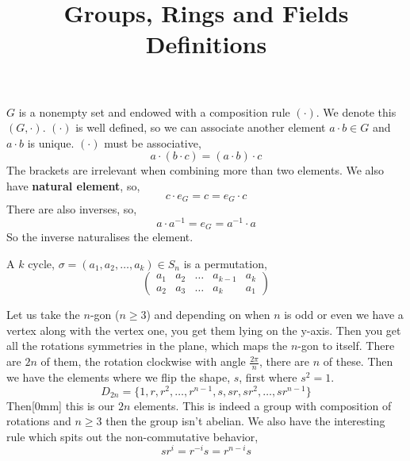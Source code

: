 \documentclass{article}
\title{Groups, Rings and Fields Definitions}
\begin{document}
\maketitle


\section[Basics of Groups]{}

\begin{ndefi}[Group]
  $G$ is a nonempty set and endowed with a composition rule $(\cdot)$. We denote this $(G, \cdot)$. $(\cdot)$ is well defined, so we can associate another element $a \cdot b \in G$ and $a \cdot b$ is unique. $(\cdot)$ must be associative,
  $$ a \cdot (b \cdot c) = (a \cdot b) \cdot c $$
  The brackets are irrelevant when combining more than two elements. We also have \textbf{natural element}, so,
  $$ c \cdot e_G = c = e_G \cdot c $$
  There are also inverses, so,
  $$ a \cdot a^{-1} = e_G = a^{-1} \cdot a $$
  So the inverse naturalises the element.
\end{ndefi}

\begin{ndefi}[k-cycle]
  A $k$ cycle, $\sigma = (a_1, a_2, \dots, a_k) \in S_n$  is a permutation,
  $$ \begin{pmatrix}
    a_1 & a_2 & \dots & a_{k-1} & a_k \\
    a_2 & a_3 & \dots & a_k & a_1
  \end{pmatrix} $$
\end{ndefi}

\begin{ndefi}
  Let us take the $n$-gon ($n \ge 3$) and depending on when $n$ is odd or even we have a vertex along with the vertex one, you get them lying on the y-axis. Then you get all the rotations symmetries in the plane, which maps the $n$-gon to itself. There are $2n$ of them, the rotation clockwise with angle $\frac{2\pi}{n}$, there are $n$ of these. Then we have the elements where we flip the shape, $s$, first where $s^2 = 1$.
  $$ D_{2n} = \{1, r, r^2, \dots, r^{n-1}, s, sr, sr^2, \dots, sr^{n-1} \} $$
  Then[0mm] this is our $2n$ elements. This is indeed a group with composition of rotations and $n \ge 3$ then the group isn't abelian. We also have the interesting rule which spits out the non-commutative behavior,
  $$ sr^i = r^{-i}s = r^{n-i}s $$
\end{ndefi}
\end{document}
